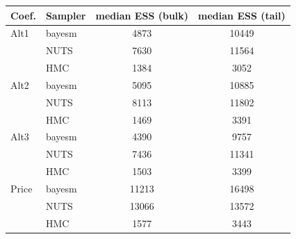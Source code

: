 \begin{tabular}{llcc}
\toprule
Coef. & Sampler & median ESS (bulk) & median ESS (tail) \\
\midrule
Alt1 & bayesm & 4873 & 10449 \\
 & NUTS & 7630 & 11564 \\
 & HMC & 1384 & 3052 \\
Alt2 & bayesm & 5095 & 10885 \\
 & NUTS & 8113 & 11802 \\
 & HMC & 1469 & 3391 \\
Alt3 & bayesm & 4390 & 9757 \\
 & NUTS & 7436 & 11341 \\
 & HMC & 1503 & 3399 \\
Price & bayesm & 11213 & 16498 \\
 & NUTS & 13066 & 13572 \\
 & HMC & 1577 & 3443 \\
\bottomrule
\end{tabular}
